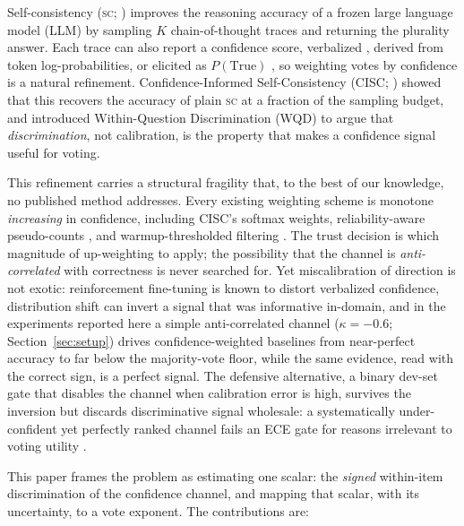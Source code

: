 \documentclass{article}
\newcommand{\SC}{\textsc{sc}}
\begin{document}
Self-consistency (\SC; \citealp{wang2023selfconsistency}) improves the reasoning accuracy of a frozen large language model (LLM) by sampling $K$ chain-of-thought traces and returning the plurality answer. Each trace can also report a confidence score, verbalized \citep{tian2023just,xiong2024can}, derived from token log-probabilities, or elicited as $P(\text{True})$ \citep{kadavath2022language}, so weighting votes by confidence is a natural refinement. Confidence-Informed Self-Consistency (CISC; \citealp{taubenfeld2025cisc}) showed that this recovers the accuracy of plain \SC{} at a fraction of the sampling budget, and introduced Within-Question Discrimination (WQD) to argue that \emph{discrimination}, not calibration, is the property that makes a confidence signal useful for voting.

This refinement carries a structural fragility that, to the best of our knowledge, no published method addresses. Every existing weighting scheme is monotone \emph{increasing} in confidence, including CISC's softmax weights, reliability-aware pseudo-counts \citep{reasc2026}, and warmup-thresholded filtering \citep{deepconf2025}. The trust decision is which magnitude of up-weighting to apply; the possibility that the channel is \emph{anti-correlated} with correctness is never searched for. Yet miscalibration of direction is not exotic: reinforcement fine-tuning is known to distort verbalized confidence, distribution shift can invert a signal that was informative in-domain, and in the experiments reported here a simple anti-correlated channel ($\kappa=-0.6$; Section~\ref{sec:setup}) drives confidence-weighted baselines from near-perfect accuracy to far below the majority-vote floor, while the same evidence, read with the correct sign, is a perfect signal. The defensive alternative, a binary dev-set gate that disables the channel when calibration error is high, survives the inversion but discards discriminative signal wholesale: a systematically under-confident yet perfectly ranked channel fails an ECE gate for reasons irrelevant to voting utility \citep{taubenfeld2025cisc,huang2024rankcalibration}.

This paper frames the problem as estimating one scalar: the \emph{signed} within-item discrimination of the confidence channel, and mapping that scalar, with its uncertainty, to a vote exponent. The contributions are:
\end{document}
